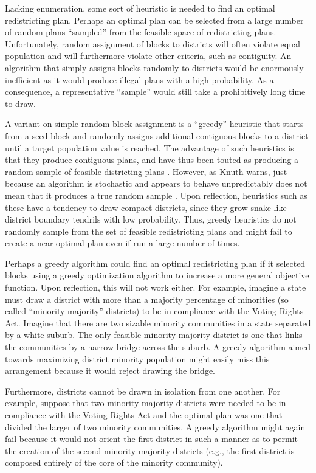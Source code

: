 \documentclass[article]{JSSstyle/jss}
\begin{document}
Lacking enumeration, some sort of heuristic is needed to find an 
optimal redistricting plan.  Perhaps an optimal plan can be selected 
from a large number of random plans ``sampled'' from the feasible 
space of redistricting plans. Unfortunately, random assignment of 
blocks to districts will often violate equal population and will 
furthermore violate other criteria, such as contiguity.  An 
algorithm that simply assigns blocks randomly to districts would be 
enormously inefficient as it would produce illegal plans with a high 
probability.  As a consequence, a representative ``sample'' would 
still take a prohibitively long time to draw.

A variant on simple random block assignment is a ``greedy'' 
heuristic that starts from a seed block and randomly assigns 
additional contiguous blocks to a district until a target population 
value is reached.  The advantage of such heuristics is that they 
produce contiguous plans, and have thus been touted as producing a 
random sample of feasible districting plans 
\citep[e.g.,][]{CirDarOro00}.  However, as Knuth warns, just 
because an algorithm is stochastic and appears to behave unpredictably does not mean 
that it produces a true random sample \citep[][]{Knuth97}.  Upon reflection, 
heuristics such as these have a tendency to draw compact districts, since they grow snake-like district boundary tendrils 
with low probability. Thus, greedy heuristics do not randomly sample from the set of feasible redistricting plans and 
might fail to create a near-optimal plan even if run a large number 
of times.

Perhaps a greedy algorithm could find an optimal redistricting plan 
if it selected blocks using a greedy optimization algorithm 
to increase a more general objective function.  Upon reflection, this will 
not work either.  For example, imagine a 
state must draw a district with more than a majority percentage of 
minorities (so called ``minority-majority'' districts) to be in 
compliance with the Voting Rights Act.  Imagine that there are two 
sizable minority communities in a state separated by a white 
suburb.  The only feasible minority-majority district is one that 
links the communities by a narrow bridge across the suburb.  A 
greedy algorithm aimed towards maximizing district minority 
population might easily miss this arrangement because it would reject 
drawing the bridge.  

Furthermore, districts cannot be drawn in isolation from one 
another.  For example, suppose that two minority-majority districts 
were needed to be in compliance with the Voting Rights Act and the 
optimal plan was one that divided the larger of two minority 
communities.  A greedy algorithm might again fail because it would 
not orient the first district in such a manner as to permit the 
creation of the second minority-majority districts (e.g., the first district is composed entirely of the core of the minority community).
\end{document}
